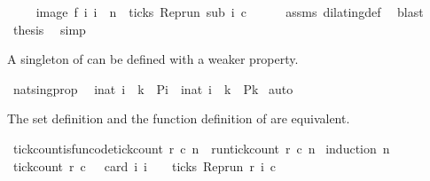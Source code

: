 \begin{isabellebody}
\ \isamarkupfalse%
\ {\isacartoucheopen}{\isachardot}{\isachardot}{\isachardot}\ {\isacharequal}\ image\ f\ {\isacharbraceleft}i{\isachardot}\ i\ {\isacharless}\ n\ {\isasymand}\ ticks\ {\isacharparenleft}{\isacharparenleft}Rep{\isacharunderscore}run\ sub{\isacharparenright}\ i\ c{\isacharparenright}{\isacharbraceright}{\isacartoucheclose}\isanewline
\ \ \ \ \isamarkupfalse%
\ assms\ dilating{\isacharunderscore}def\ \isamarkupfalse%
\ blast\isanewline
\ \ \isamarkupfalse%
\ \isamarkupfalse%
\ {\isacharquery}thesis\ \isamarkupfalse%
\ simp\isanewline
{}\isamarkupfalse%
%
\endisatagproof
{\isafoldproof}%
%
\isadelimproof
%
\endisadelimproof
%
\begin{isamarkuptext}%
A singleton of  can be defined with a weaker property.%
\end{isamarkuptext}\isamarkuptrue%
\isamarkupfalse%
\ nat{\isacharunderscore}sing{\isacharunderscore}prop{\isacharcolon}\isanewline
\ \ {\isacartoucheopen}{\isacharbraceleft}i{\isacharcolon}{\isacharcolon}nat{\isachardot}\ i\ {\isacharequal}\ k\ {\isasymand}\ P{\isacharparenleft}i{\isacharparenright}{\isacharbraceright}\ {\isacharequal}\ {\isacharbraceleft}i{\isacharcolon}{\isacharcolon}nat{\isachardot}\ i\ {\isacharequal}\ k\ {\isasymand}\ P{\isacharparenleft}k{\isacharparenright}{\isacharbraceright}{\isacartoucheclose}\isanewline
%
\isadelimproof
%
\endisadelimproof
%
\isatagproof
{}\isamarkupfalse%
\ auto%
\endisatagproof
{\isafoldproof}%
%
\isadelimproof
%
\endisadelimproof
%
\begin{isamarkuptext}%
The set definition and the function definition of 
  are equivalent.%
\end{isamarkuptext}\isamarkuptrue%
\isamarkupfalse%
\ tick{\isacharunderscore}count{\isacharunderscore}is{\isacharunderscore}fun{\isacharbrackleft}code{\isacharbrackright}{\isacharcolon}{\isacartoucheopen}tick{\isacharunderscore}count\ r\ c\ n\ {\isacharequal}\ run{\isacharunderscore}tick{\isacharunderscore}count\ r\ c\ n{\isacartoucheclose}\isanewline
%
\isadelimproof
%
\endisadelimproof
%
\isatagproof
{}\isamarkupfalse%
\ {\isacharparenleft}induction\ n{\isacharparenright}\isanewline
\ \ \isamarkupfalse%
\ {}\isanewline
\ \ \ \ \isamarkupfalse%
\ {\isacartoucheopen}tick{\isacharunderscore}count\ r\ c\ {}\ {\isacharequal}\ card\ {\isacharbraceleft}i{\isachardot}\ i\ {\isasymle}\ {}\ {\isasymand}\ ticks\ {\isacharparenleft}{\isacharparenleft}Rep{\isacharunderscore}run\ r{\isacharparenright}\ i\ c{\isacharparenright}{\isacharbraceright}{\isacartoucheclose}\isanewline

\end{isabellebody}

